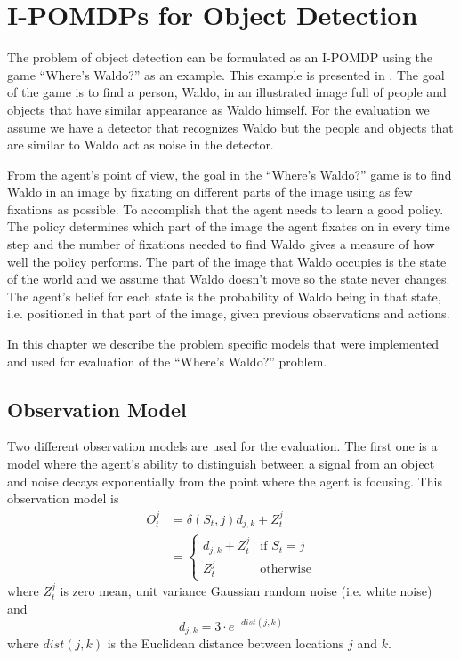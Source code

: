 
\chapter{I-POMDPs for Object Detection}
\label{ch:IPOMDP}
The problem of object detection can be formulated as an I-POMDP using the game ``Where's Waldo?'' as an example. This example is presented in \cite{Butko2010b}. The goal of the game is to find a person, Waldo, in an illustrated image full of people and objects that have similar appearance as Waldo himself. For the evaluation we assume we have a detector that recognizes Waldo but the people and objects that are similar to Waldo act as noise in the detector.

From the agent's point of view, the goal in the ``Where's Waldo?'' game is to find Waldo in an image by fixating on different parts of the image using as few fixations as possible. To accomplish that the agent needs to learn a good policy. The policy determines which part of the image the agent fixates on in every time step and the number of fixations needed to find Waldo gives a measure of how well the policy performs. The part of the image that Waldo occupies is the state of the world and we assume that Waldo doesn't move so the state never changes. The agent's belief for each state is  the probability of Waldo being in that state, i.e. positioned in that part of the image, given previous observations and actions.

In this chapter we describe the problem specific models that were implemented and used for evaluation of the ``Where's Waldo?'' problem.

\section{Observation Model}
\label{sec:ObservationModelImpl}
Two different observation models are used for the evaluation. The first one is a model where the agent's ability to distinguish between a signal from an object and noise decays exponentially from the point where the agent is focusing. This observation model is
\begin{equation}\label{eq:ObservationModel}
  \begin{split}
    O_t^j &= \delta (S_t, j) d_{j,k} + Z_t^j \\
          &= \begin{cases}
                d_{j,k} + Z_t^j & \text{if $S_t = j$}\\
                Z_t^j           & \text{otherwise}
             \end{cases}
  \end{split}
\end{equation}
where $Z_t^j$ is zero mean, unit variance Gaussian random noise (i.e. white noise) and
\begin{equation}
  d_{j,k} = 3 \cdot e^{-dist(j,k)}
\end{equation}
where $dist(j,k)$ is the Euclidean distance between locations $j$ and $k$.

